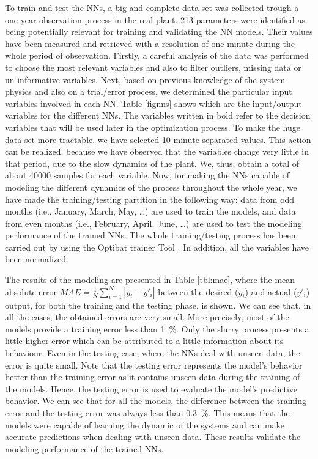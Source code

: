 To train and test the NNs, a big and complete data set was collected trough a one-year observation process in the real plant.  213 parameters were identified as being potentially relevant for training and validating the NN models. Their values have been measured and retrieved with a resolution of one minute during the whole period of observation. Firstly, a careful analysis of the data was performed to choose the most relevant variables and also to filter outliers, missing data or un-informative variables. Next, based on previous knowledge of the system physics and also on a trial/error process, we determined the particular input variables involved in each NN. Table \ref{fignns} shows which are the input/output variables for the different NNs. The variables written in bold refer to the decision variables that will be used later in the optimization process. To make the huge data set more tractable, we have selected 10-minute separated values. This action can be realized, because we have observed that the variables change very little in that period, due to the slow dynamics of the plant. We, thus, obtain a total of about \num{40000} samples for each variable. Now, for making the NNs capable of modeling the different dynamics of the process throughout the whole year, we have made the training/testing partition in the following way: data from odd months (i.e., January, March, May, \dots) are used to train the models, and data from even months (i.e., February, April, June, \dots) are used to test the modeling performance of the trained NNs. The whole training/testing process has been carried out by using the Optibat trainer Tool \cite{Optibat}. In addition, all the variables have been normalized.



The results of the modeling are presented in Table \ref{tbl:mae}, where the mean absolute error $MAE=\frac{1}{N}\sum_{i=1}^{N}{|y_i-y'_i|}$ between the desired ($y_i$) and actual ($y'_i$) output, for both the training and the testing phase, is shown. We can see that, in all the cases, the obtained  errors are very small. More precisely, most of the models provide a training error less than \SI{1}{\percent}. Only the slurry process presents a little higher error which can be attributed to a little information about its behaviour. Even in the testing case, where the NNs deal with unseen data, the error is quite small. Note that the testing error represents the model's behavior better than the training error as it contains unseen data during the training of the models. Hence, the testing error is used to evaluate the  model's  predictive behavior. We can see that for all the models, the difference between the training error and the testing error was always less than \SI{0.3}{\percent}. This means that the models were capable of learning the dynamic of the systems and can make accurate predictions when dealing with unseen data. These results validate the modeling performance of the trained NNs. 

